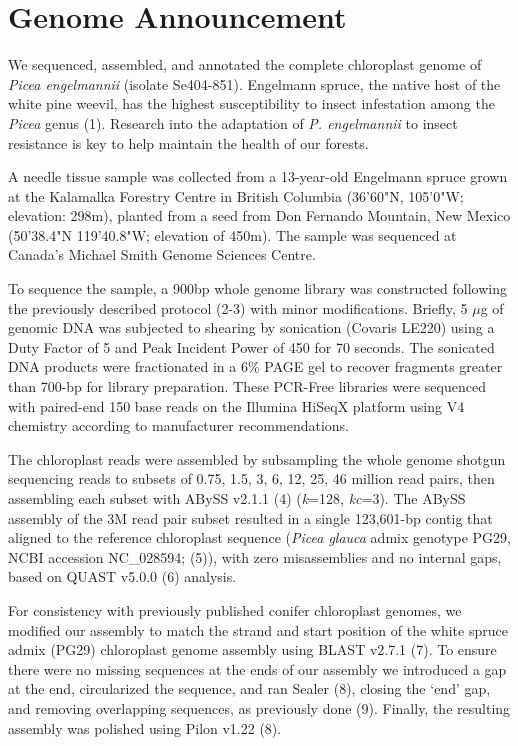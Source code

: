 \documentclass[titlepage,11pt, oneside]{article}   	%
\begin{document}
\section*{Genome Announcement}
We sequenced, assembled, and annotated the complete chloroplast genome of \textit{Picea engelmannii} (isolate Se404-851). Engelmann spruce, the native host of the white pine weevil, has the highest susceptibility to insect infestation among the \textit{Picea} genus (1). Research into the adaptation of \textit{P. engelmannii} to insect resistance is key to help maintain the health of our forests.
\newline
\par
A needle tissue sample was collected from a 13-year-old Engelmann spruce grown at the Kalamalka Forestry Centre in British Columbia (36'60"N, 105'0"W; elevation: 298m), planted from a seed from Don Fernando Mountain, New Mexico (50'38.4"N 119'40.8"W; elevation of 450m). The sample was sequenced at Canada’s Michael Smith Genome Sciences Centre.
\newline
\par
To sequence the sample, a 900bp whole genome library was constructed following the previously described protocol (2-3) with minor modifications. Briefly, 5 $\mu$g of genomic DNA was subjected to shearing by sonication (Covaris LE220) using a Duty Factor of 5 and Peak Incident Power of 450 for 70 seconds. The sonicated DNA products were fractionated in a 6\% PAGE gel to recover fragments greater than 700-bp for library preparation. These PCR-Free libraries were sequenced with paired-end 150 base reads on the Illumina HiSeqX platform using V4 chemistry according to manufacturer recommendations.
\newline
\par
The chloroplast reads were assembled by subsampling the whole genome shotgun sequencing reads to subsets of 0.75, 1.5, 3, 6, 12, 25, 46 million read pairs, then assembling each subset with ABySS v2.1.1 (4) (\textit{k}=128, \textit{kc}=3). The ABySS assembly of the 3M read pair subset resulted in a single 123,601-bp contig that aligned to the reference chloroplast sequence (\textit{Picea glauca} admix genotype PG29, NCBI accession NC\_028594; (5)), with zero misassemblies and no internal gaps, based on QUAST v5.0.0 (6) analysis.
\newline
\par
For consistency with previously published conifer chloroplast genomes, we modified our assembly to match the strand and start position of the white spruce admix (PG29) chloroplast genome assembly using BLAST v2.7.1 (7). To ensure there were no missing sequences at the ends of our assembly we introduced a gap at the end, circularized the sequence, and ran Sealer (8), closing the ‘end’ gap, and removing overlapping sequences, as previously done (9). Finally, the resulting assembly was polished using Pilon v1.22 (8).
\end{document}
